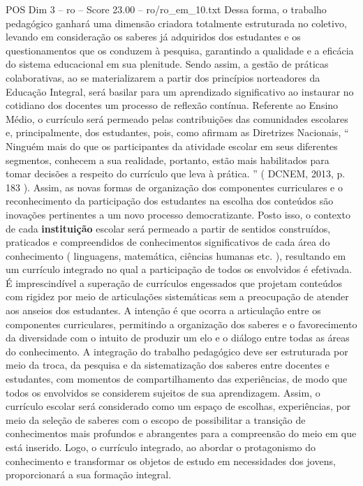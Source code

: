 \begin{textsample}{POS Dim 3 – ro – Score 23.00 – ro/ro\_em\_10.txt}
Dessa forma, o trabalho pedagógico ganhará uma dimensão criadora totalmente estruturada no coletivo, levando em consideração os saberes já adquiridos dos estudantes e os questionamentos que os conduzem à pesquisa, garantindo a qualidade e a eficácia do sistema educacional em sua plenitude.
Sendo assim, a gestão de práticas colaborativas, ao se materializarem a partir dos princípios norteadores da Educação Integral, será basilar para um aprendizado significativo ao instaurar no cotidiano dos docentes um processo de reflexão contínua.
Referente ao Ensino Médio, o currículo será permeado pelas contribuições das comunidades escolares e, principalmente, dos estudantes, pois, como afirmam as Diretrizes Nacionais, “ Ninguém mais do que os participantes da atividade escolar em seus diferentes segmentos, conhecem a sua realidade, portanto, estão mais habilitados para tomar decisões a respeito do currículo que leva à prática. ” ( DCNEM, 2013, p. 183 ).
Assim, as novas formas de organização dos componentes curriculares e o reconhecimento da participação dos estudantes na escolha dos conteúdos são inovações pertinentes a um novo processo democratizante.
Posto isso, o contexto de cada \textbf{instituição} escolar será permeado a partir de sentidos construídos, praticados e compreendidos de conhecimentos significativos de cada área do conhecimento ( linguagens, matemática, ciências humanas etc. ), resultando em um currículo integrado no qual a participação de todos os envolvidos é efetivada.
É imprescindível a superação de currículos engessados que projetam conteúdos com rigidez por meio de articulações sistemáticas sem a preocupação de atender aos anseios dos estudantes.
A intenção é que ocorra a articulação entre os componentes curriculares, permitindo a organização dos saberes e o favorecimento da diversidade com o intuito de produzir um elo e o diálogo entre todas as áreas do conhecimento.
A integração do trabalho pedagógico deve ser estruturada por meio da troca, da pesquisa e da sistematização dos saberes entre docentes e estudantes, com momentos de compartilhamento das experiências, de modo que todos os envolvidos se considerem sujeitos de sua aprendizagem.
Assim, o currículo escolar será considerado como um espaço de escolhas, experiências, por meio da seleção de saberes com o escopo de possibilitar a transição de conhecimentos mais profundos e abrangentes para a compreensão do meio em que está inserido.
Logo, o currículo integrado, ao abordar o protagonismo do conhecimento e transformar os objetos de estudo em necessidades dos jovens, proporcionará a sua formação integral.

\end{textsample}
